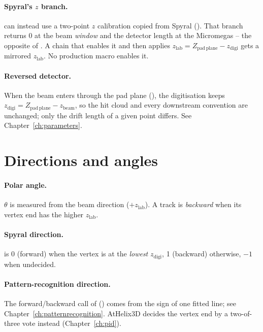 \paragraph{Spyral's $z$ branch.}  can instead use a two-point $z$ calibration copied from Spyral
(). That branch returns 0 at the beam \emph{window} and the detector length at the Micromegas -- the
opposite of . A chain that enables it and then applies $z_\mathrm{lab} = Z_\mathrm{pad\,plane} -
z_\mathrm{digi}$ gets a mirrored $z_\mathrm{lab}$. No production macro enables it.

\paragraph{Reversed detector.} When the beam enters through the pad plane (), the digitisation
keeps $z_\mathrm{digi} = Z_\mathrm{pad\,plane} - z_\mathrm{beam}$, so the hit cloud and every downstream convention
are unchanged; only the drift length of a given point differs. See Chapter~\ref{ch:parameters}.

\section{Directions and angles}

\paragraph{Polar angle.} $\theta$ is measured from the beam direction ($+z_\mathrm{lab}$). A track is
\emph{backward} when its vertex end has the higher $z_\mathrm{lab}$.

\paragraph{Spyral direction.}  is 0 (forward) when the vertex is at the
\emph{lowest} $z_\mathrm{digi}$, 1 (backward) otherwise, $-1$ when undecided.

\paragraph{Pattern-recognition direction.} The forward/backward call of  () comes from the
sign of one fitted line; see Chapter~\ref{ch:patternrecognition}. AtHelix3D decides the vertex end by a two-of-three
vote instead (Chapter~\ref{ch:pid}).

